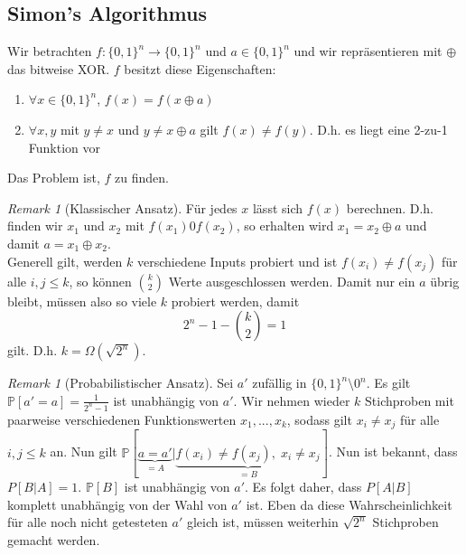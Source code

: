 \documentclass[a4paper, 12pt]{article}
\theoremstyle{plain}
\theoremstyle{definition}
\theoremstyle{lemma}
\theoremstyle{remark}
\newtheorem{remark}[theorem]{Remark}
\theoremstyle{example}
\begin{document}
	\subsection{Simon's Algorithmus}
	Wir betrachten $f: \{0,1\}^n \to \{0,1\}^n$ und $a \in \{0,1\}^n$ und wir repräsentieren mit $\oplus$ das bitweise XOR. $f$ besitzt diese Eigenschaften:
	\begin{enumerate}
		\item $\forall x \in \{0,1\}^n$, $f(x) = f(x\oplus a)$
		\item $\forall x,y$ mit $y\neq x$ und $y\neq x\oplus a$ gilt $f(x)\neq f(y)$. D.h. es liegt eine 2-zu-1 Funktion vor
	\end{enumerate}
	Das Problem ist, $f$ zu finden.\\
	\begin{remark}[Klassischer Ansatz]
		Für jedes $x$ lässt sich $f(x)$ berechnen. D.h. finden wir $x_1$ und $x_2$ mit $f(x_1) 0 f(x_2)$, so erhalten wird $x_1 = x_2 \oplus a$ und damit $a = x_1\oplus x_2$.\\
		Generell gilt, werden $k$ verschiedene Inputs probiert und ist $f(x_i) \neq f(x_j)$ für alle $i,j \leq k$, so können $\binom{k}{2}$ Werte ausgeschlossen werden. Damit nur ein $a$ übrig bleibt, müssen also so viele $k$ probiert werden, damit \[2^n-1-\binom{k}{2} = 1\] gilt. D.h. $k = \Omega(\sqrt{2^n})$.
	\end{remark}
	\begin{remark}[Probabilistischer Ansatz]
		Sei $a'$ zufällig in $\{0,1\}^n \setminus 0^n$. Es gilt $\mathbb{P}[a' = a] = \frac{1}{2^n-1}$ ist unabhängig von $a'$. Wir nehmen wieder $k$ Stichproben mit paarweise verschiedenen Funktionswerten $x_1,...,x_k$, sodass gilt $x_i \neq x_j$ für alle $i,j\leq k$ an. Nun gilt $\mathbb{P}[\underbrace{a = a'}_{=A}| \underbrace{f(x_i) \neq f(x_j), \; x_i \neq x_j}_{=B}]$. Nun ist bekannt, dass $P[B|A] = 1$. $\mathbb{P}[B]$ ist unabhängig von $a'$. Es folgt daher, dass $P[A|B]$ komplett unabhängig von der Wahl von $a'$ ist. Eben da diese Wahrscheinlichkeit für alle noch nicht getesteten $a'$ gleich ist, müssen weiterhin $\sqrt{2^n}$ Stichproben gemacht werden.
	\end{remark}
\end{document}

